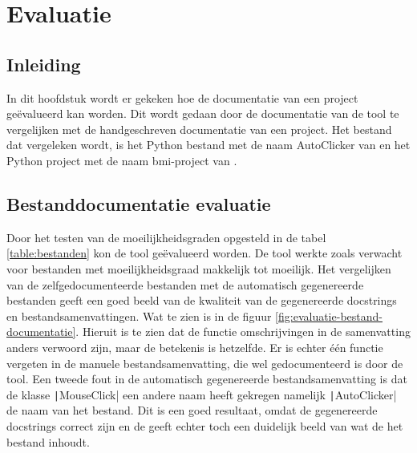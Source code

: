 \section{Evaluatie}
\label{sec:project-documentatie-evaluatie}

\subsection{Inleiding}
\label{sec:project-documentatie-evaluatie-inleiding}

In dit hoofdstuk wordt er gekeken hoe de documentatie van een project geëvalueerd kan worden.
Dit wordt gedaan door de documentatie van de tool te vergelijken met de handgeschreven documentatie van een project.
Het bestand dat vergeleken wordt, is het Python bestand met de naam AutoClicker van \textcite{Waegeneer2022} en het Python project met de naam bmi-project van \textcite{Simmons2019}.

\subsection{Bestanddocumentatie evaluatie}
\label{sec:project-documentatie-evaluatie-bestand}

Door het testen van de moeilijkheidsgraden opgesteld in de tabel \ref{table:bestanden} kon de tool geëvalueerd worden.
De tool werkte zoals verwacht voor bestanden met moeilijkheidsgraad makkelijk tot moeilijk.
Het vergelijken van de zelfgedocumenteerde bestanden met de automatisch gegenereerde bestanden geeft een goed beeld van de kwaliteit van de gegenereerde docstrings en bestandsamenvattingen.
Wat te zien is in de figuur \ref{fig:evaluatie-bestand-documentatie}.
Hieruit is te zien dat de functie omschrijvingen in de samenvatting anders verwoord zijn, maar de betekenis is hetzelfde.
Er is echter één functie vergeten in de manuele bestandsamenvatting, die wel gedocumenteerd is door de tool.
Een tweede fout in de automatisch gegenereerde bestandsamenvatting is dat de klasse \texttt|MouseClick| een andere naam heeft gekregen namelijk \texttt|AutoClicker| de naam van het bestand.
Dit is een goed resultaat, omdat de gegenereerde docstrings correct zijn en de geeft echter toch een duidelijk beeld van wat de het bestand inhoudt.

